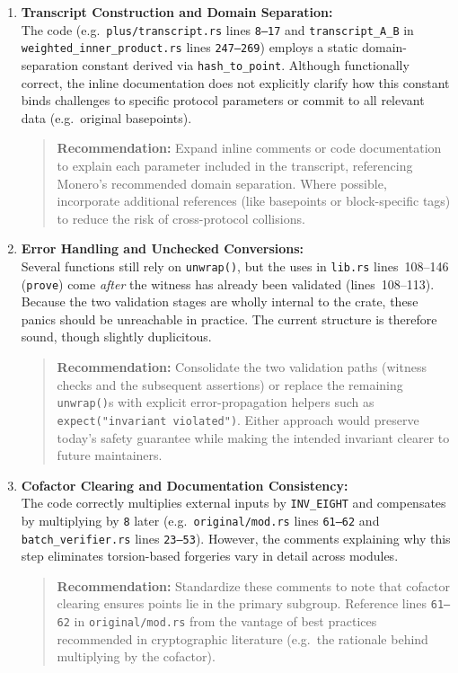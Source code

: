 \documentclass[12pt,a4paper]{article}
\begin{document}
\begin{enumerate}
    \item \textbf{Transcript Construction and Domain Separation:}\\
    The code (e.g.\ \texttt{plus/transcript.rs} lines \texttt{8--17} and \texttt{transcript\_A\_B} in \\\texttt{weighted\_inner\_product.rs} lines \texttt{247--269}) employs a static domain-separation constant derived via \texttt{hash\_to\_point}. Although functionally correct, the inline documentation does not explicitly clarify how this constant binds challenges to specific protocol parameters or commit to all relevant data (e.g.\ original basepoints).
    \begin{quote}
        \textbf{Recommendation:} Expand inline comments or code documentation to explain each parameter included in the transcript, referencing Monero’s recommended domain separation. Where possible, incorporate additional references (like basepoints or block-specific tags) to reduce the risk of cross-protocol collisions.
    \end{quote}

    \item \textbf{Error Handling and Unchecked Conversions:}\\
    Several functions still rely on \texttt{unwrap()}, but the
    uses in \texttt{lib.rs} lines~108–146 (\texttt{prove}) come \emph{after} the witness has
    already been validated (lines~108–113).
    Because the two validation stages are wholly internal to the crate, these panics should be
    unreachable in practice.  The current structure is therefore sound, though slightly
    duplicitous.

    \begin{quote}
      \textbf{Recommendation:} Consolidate the two validation paths (witness checks and the
      subsequent assertions) or replace the remaining \texttt{unwrap()}s with explicit
      error-propagation helpers such as \texttt{expect("invariant violated")}.  Either approach
      would preserve today’s safety guarantee while making the intended invariant clearer to
      future maintainers.
    \end{quote}

    \item \textbf{Cofactor Clearing and Documentation Consistency:}\\
    The code correctly multiplies external inputs by \texttt{INV\_EIGHT} and compensates by multiplying by \texttt{8} later (e.g.\ \texttt{original/mod.rs} lines \texttt{61--62} and \texttt{batch\_verifier.rs} lines \texttt{23--53}). However, the comments explaining why this step eliminates torsion-based forgeries vary in detail across modules.
    \begin{quote}
        \textbf{Recommendation:} Standardize these comments to note that cofactor clearing ensures points lie in the primary subgroup. Reference lines \texttt{61--62} in \texttt{original/mod.rs} from the vantage of best practices recommended in cryptographic literature (e.g.\ the rationale behind multiplying by the cofactor).
    \end{quote}


\end{enumerate}
\end{document}
